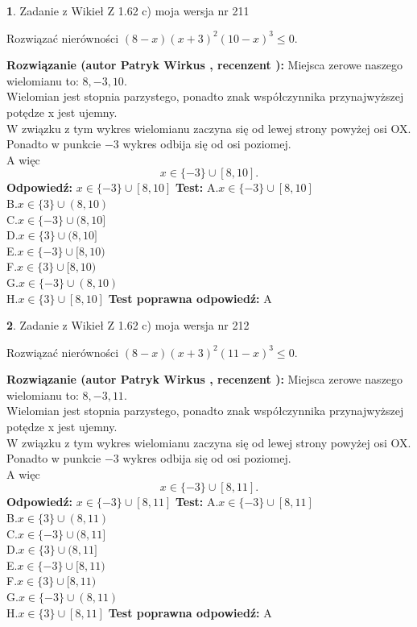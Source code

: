 \documentclass[12pt, a4paper]{article}
\theoremstyle{definition} %
\newtheorem{zad}{}
\newcommand{\zadStart}[1]{\begin{zad}#1\newline}
\newcommand{\zadStop}{\end{zad}}
\newcommand{\rozwStart}[2]{\noindent \textbf{Rozwiązanie (autor #1 , recenzent #2): }\newline}
\newcommand{\rozwStop}{\newline}
\newcommand{\odpStart}{\noindent \textbf{Odpowiedź:}\newline}
\newcommand{\odpStop}{\newline}
\newcommand{\testStart}{\noindent \textbf{Test:}\newline}
\newcommand{\testStop}{\newline}
\newcommand{\kluczStart}{\noindent \textbf{Test poprawna odpowiedź:}\newline}
\newcommand{\kluczStop}{\newline}
\begin{document}
\zadStart{Zadanie z Wikieł Z 1.62 c) moja wersja nr 211}

Rozwiązać nierówności $(8-x)(x+3)^{2}(10-x)^{3}\le0$.
\zadStop
\rozwStart{Patryk Wirkus}{}
Miejsca zerowe naszego wielomianu to: $8, -3, 10$.\\
Wielomian jest stopnia parzystego, ponadto znak współczynnika przy\linebreak najwyższej potędze x jest ujemny.\\ W związku z tym wykres wielomianu zaczyna się od lewej strony powyżej osi OX.\\
Ponadto w punkcie $-3$ wykres odbija się od osi poziomej.\\
A więc $$x \in \{-3\} \cup [8,10].$$
\rozwStop
\odpStart
$x \in \{-3\} \cup [8,10]$
\odpStop
\testStart
A.$x \in \{-3\} \cup [8,10]$\\
B.$x \in \{3\} \cup (8,10)$\\
C.$x \in \{-3\} \cup (8,10]$\\
D.$x \in \{3\} \cup (8,10]$\\
E.$x \in \{-3\} \cup [8,10)$\\
F.$x \in \{3\} \cup [8,10)$\\
G.$x \in \{-3\} \cup (8,10)$\\
H.$x \in \{3\} \cup [8,10]$
\testStop
\kluczStart
A
\kluczStop



\zadStart{Zadanie z Wikieł Z 1.62 c) moja wersja nr 212}

Rozwiązać nierówności $(8-x)(x+3)^{2}(11-x)^{3}\le0$.
\zadStop
\rozwStart{Patryk Wirkus}{}
Miejsca zerowe naszego wielomianu to: $8, -3, 11$.\\
Wielomian jest stopnia parzystego, ponadto znak współczynnika przy\linebreak najwyższej potędze x jest ujemny.\\ W związku z tym wykres wielomianu zaczyna się od lewej strony powyżej osi OX.\\
Ponadto w punkcie $-3$ wykres odbija się od osi poziomej.\\
A więc $$x \in \{-3\} \cup [8,11].$$
\rozwStop
\odpStart
$x \in \{-3\} \cup [8,11]$
\odpStop
\testStart
A.$x \in \{-3\} \cup [8,11]$\\
B.$x \in \{3\} \cup (8,11)$\\
C.$x \in \{-3\} \cup (8,11]$\\
D.$x \in \{3\} \cup (8,11]$\\
E.$x \in \{-3\} \cup [8,11)$\\
F.$x \in \{3\} \cup [8,11)$\\
G.$x \in \{-3\} \cup (8,11)$\\
H.$x \in \{3\} \cup [8,11]$
\testStop
\kluczStart
A
\kluczStop
\end{document}
